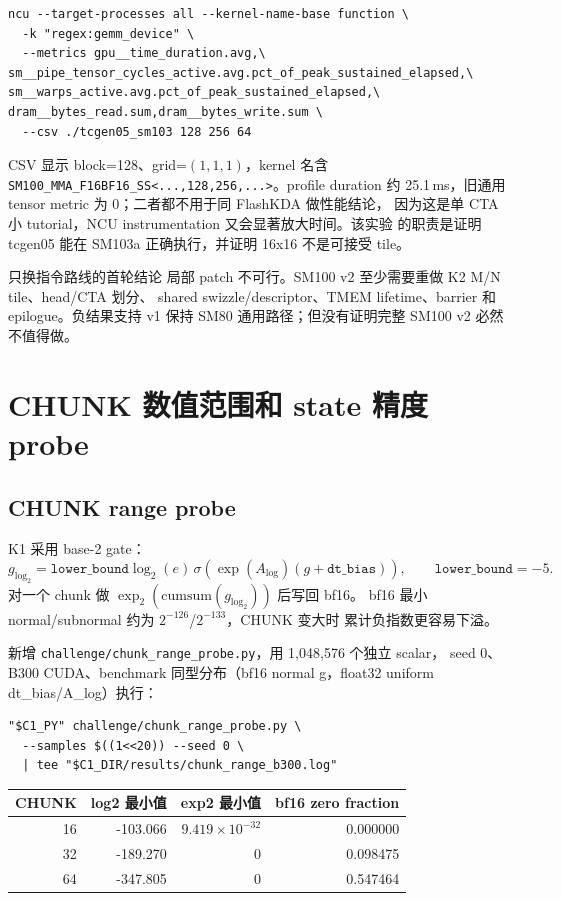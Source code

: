 \documentclass[11pt,a4paper,fontset=none]{ctexart}
\newcommand{\code}[1]{\texttt{#1}}
\begin{document}
\begin{lstlisting}
ncu --target-processes all --kernel-name-base function \
  -k "regex:gemm_device" \
  --metrics gpu__time_duration.avg,\
sm__pipe_tensor_cycles_active.avg.pct_of_peak_sustained_elapsed,\
sm__warps_active.avg.pct_of_peak_sustained_elapsed,\
dram__bytes_read.sum,dram__bytes_write.sum \
  --csv ./tcgen05_sm103 128 256 64
\end{lstlisting}

CSV 显示 block=128、grid=\((1,1,1)\)，kernel 名含
\code{SM100\_MMA\_F16BF16\_SS<...,128,256,...>}。profile duration 约
25.1\,ms，旧通用 tensor metric 为 0；二者都不用于同 FlashKDA 做性能结论，
因为这是单 CTA 小 tutorial，NCU instrumentation 又会显著放大时间。该实验
的职责是证明 tcgen05 能在 SM103a 正确执行，并证明 16x16 不是可接受 tile。

\begin{decision}{只换指令路线的首轮结论}
局部 patch 不可行。SM100 v2 至少需要重做 K2 M/N tile、head/CTA 划分、
shared swizzle/descriptor、TMEM lifetime、barrier 和 epilogue。负结果支持
v1 保持 SM80 通用路径；但没有证明完整 SM100 v2 必然不值得做。
\end{decision}

\section{CHUNK 数值范围和 state 精度 probe}

\subsection{CHUNK range probe}

K1 采用 base-2 gate：
\[
g_{\log_2}=\texttt{lower\_bound}\log_2(e)\,
\sigma(\exp(A_{\log})(g+\texttt{dt\_bias})),\qquad
\texttt{lower\_bound}=-5.
\]
对一个 chunk 做 \(\exp_2(\mathrm{cumsum}(g_{\log_2}))\) 后写回 bf16。
bf16 最小 normal/subnormal 约为 \(2^{-126}\)/\(2^{-133}\)，CHUNK 变大时
累计负指数更容易下溢。

新增 \code{challenge/chunk\_range\_probe.py}，用 1,048,576 个独立 scalar，
seed 0、B300 CUDA、benchmark 同型分布（bf16 normal g，float32 uniform
dt\_bias/A\_log）执行：

\begin{lstlisting}
"$C1_PY" challenge/chunk_range_probe.py \
  --samples $((1<<20)) --seed 0 \
  | tee "$C1_DIR/results/chunk_range_b300.log"
\end{lstlisting}

\begin{center}\small
\begin{tabular}{@{}rrrr@{}}
\toprule
CHUNK & log2 最小值 & exp2 最小值 & bf16 zero fraction \\
\midrule
16 & -103.066 & \(9.419\times10^{-32}\) & 0.000000 \\
32 & -189.270 & 0 & 0.098475 \\
64 & -347.805 & 0 & 0.547464 \\
\bottomrule
\end{tabular}
\end{center}
\end{document}
